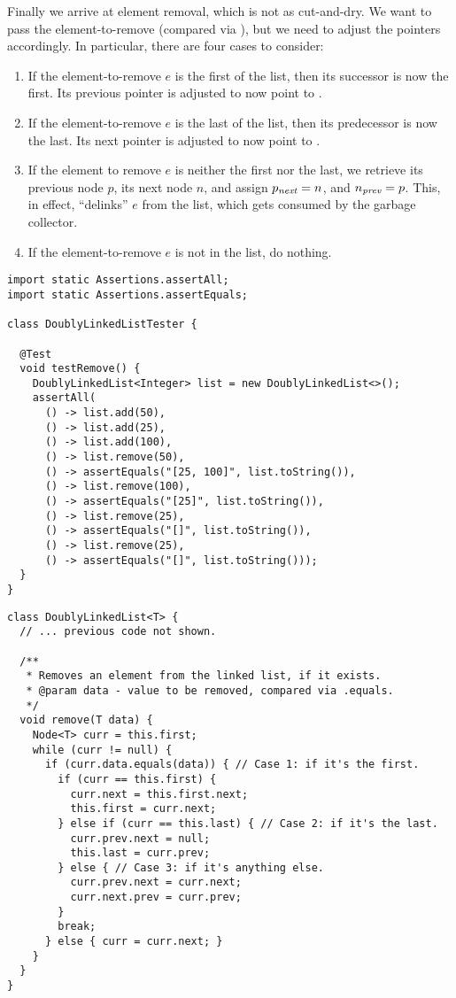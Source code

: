 Finally we arrive at element removal, which is not as cut-and-dry. We want to pass the element-to-remove (compared via ), but we need to adjust the pointers accordingly. In particular, there are four cases to consider:

\begin{enumerate}[label=(\alph*)]
  \item If the element-to-remove $e$ is the first of the list, then its successor is now the first. Its previous pointer is adjusted to now point to .
  \item If the element-to-remove $e$ is the last of the list, then its predecessor is now the last. Its next pointer is adjusted to now point to .
  \item If the element to remove $e$ is neither the first nor the last, we retrieve its previous node $p$, its next node $n$, and assign $p_\emph{next} = n$, and $n_\emph{prev} = p$. This, in effect, ``delinks'' $e$ from the list, which gets consumed by the garbage collector.
  \item If the element-to-remove $e$ is not in the list, do nothing.
\end{enumerate}

\begin{lstlisting}[language=MyJava]
import static Assertions.assertAll;
import static Assertions.assertEquals;

class DoublyLinkedListTester {

  @Test
  void testRemove() {
    DoublyLinkedList<Integer> list = new DoublyLinkedList<>();
    assertAll(
      () -> list.add(50),
      () -> list.add(25),
      () -> list.add(100),
      () -> list.remove(50),
      () -> assertEquals("[25, 100]", list.toString()),
      () -> list.remove(100),
      () -> assertEquals("[25]", list.toString()),
      () -> list.remove(25),
      () -> assertEquals("[]", list.toString()),
      () -> list.remove(25),
      () -> assertEquals("[]", list.toString()));
  }
}
\end{lstlisting}

\begin{lstlisting}[language=MyJava]
class DoublyLinkedList<T> {
  // ... previous code not shown.

  /**
   * Removes an element from the linked list, if it exists.
   * @param data - value to be removed, compared via .equals.
   */
  void remove(T data) {
    Node<T> curr = this.first;
    while (curr != null) {
      if (curr.data.equals(data)) { // Case 1: if it's the first.
        if (curr == this.first) {
          curr.next = this.first.next;
          this.first = curr.next;
        } else if (curr == this.last) { // Case 2: if it's the last.
          curr.prev.next = null;
          this.last = curr.prev;
        } else { // Case 3: if it's anything else.
          curr.prev.next = curr.next;
          curr.next.prev = curr.prev;
        }
        break;
      } else { curr = curr.next; }
    }
  }
}
\end{lstlisting}

